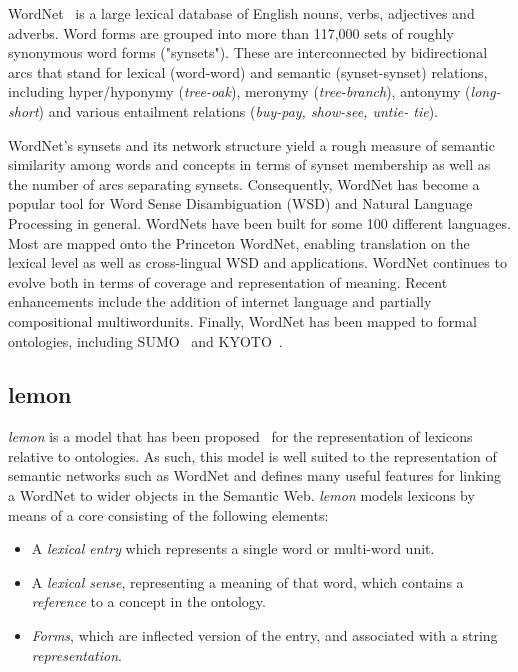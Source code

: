 \documentclass[10pt, a4paper]{article}
\newcommand{\lemon}[0]{\emph{lemon}}
\begin{document}
WordNet~\cite{miller1995wordnet,fellbaum2010wordnet} is a large lexical database of English nouns,
verbs, adjectives and adverbs. Word forms are grouped into more than 117,000 sets of
roughly synonymous word forms ("synsets"). These are interconnected by bidirectional
arcs that stand for lexical (word-word) and semantic (synset-synset) relations, including
hyper/hyponymy (\emph{tree-oak}), meronymy (\emph{tree-branch}), antonymy
(\emph{long-short}) and various entailment relations (\emph{buy-pay, show-see, untie-
tie}).

WordNet's synsets and its network structure yield a rough measure of semantic similarity
among words and concepts in terms of synset membership as well as the number of arcs
separating synsets. Consequently, WordNet has become a popular tool for Word Sense
Disambiguation (WSD) and Natural Language Processing in general. WordNets have
been built for some 100 different languages. Most are mapped onto the Princeton
WordNet, enabling translation on the lexical level as well as cross-lingual WSD and
applications. WordNet continues to evolve both in terms of coverage and representation
of meaning. Recent enhancements include the addition of internet language and partially
compositional multi­word­units. Finally, WordNet has been mapped to formal ontologies, 
including SUMO~\cite{niles2003mapping} and KYOTO~\cite{Hicks}.

\subsection{lemon}

\lemon{} is a model that has been proposed~\cite{mccrae2012interchanging} for the representation of
lexicons relative to ontologies. As such, this model is well suited to the
representation of semantic networks such as WordNet and defines many useful
features for linking a WordNet to wider objects in the Semantic Web. \lemon{}
models lexicons by means of a core consisting of the following elements:

\begin{itemize}
  \item A \emph{lexical entry} which represents a single word or multi-word
    unit.
  \item A \emph{lexical sense}, representing a meaning of that word, which
    contains a \emph{reference} to a concept in the ontology.
  \item \emph{Forms}, which are inflected version of the entry, and associated
    with a string \emph{representation}.
\end{itemize}
\end{document}
